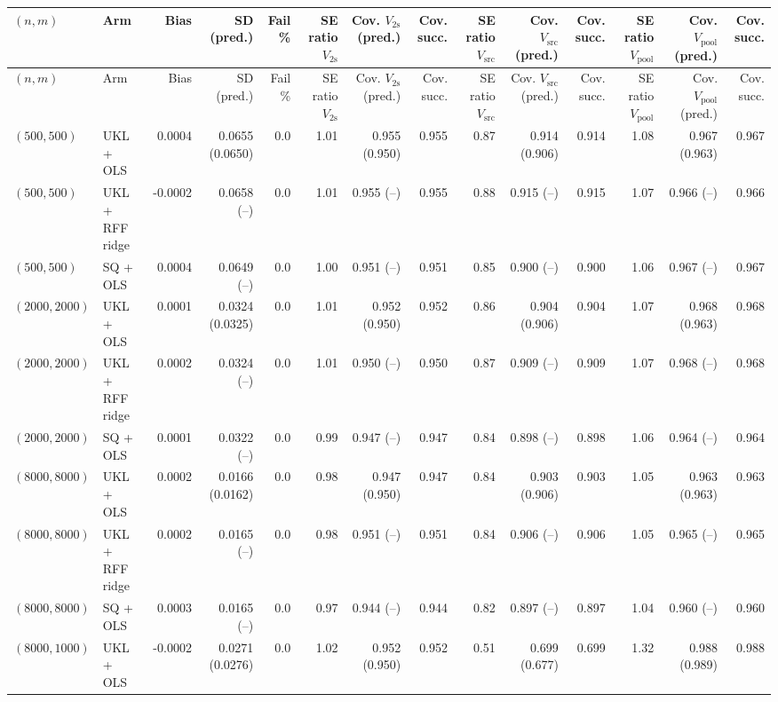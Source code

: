 \begin{tabular}{llrrrrrrrrrrrr}
\hline
$(n,m)$ & Arm & Bias & SD (pred.) & Fail \% & SE ratio $V_{\mathrm{2s}}$ & Cov. $V_{\mathrm{2s}}$ (pred.) & Cov. succ. & SE ratio $V_{\mathrm{src}}$ & Cov. $V_{\mathrm{src}}$ (pred.) & Cov. succ. & SE ratio $V_{\mathrm{pool}}$ & Cov. $V_{\mathrm{pool}}$ (pred.) & Cov. succ. \\
\hline
\endfirsthead
\hline
$(n,m)$ & Arm & Bias & SD (pred.) & Fail \% & SE ratio $V_{\mathrm{2s}}$ & Cov. $V_{\mathrm{2s}}$ (pred.) & Cov. succ. & SE ratio $V_{\mathrm{src}}$ & Cov. $V_{\mathrm{src}}$ (pred.) & Cov. succ. & SE ratio $V_{\mathrm{pool}}$ & Cov. $V_{\mathrm{pool}}$ (pred.) & Cov. succ. \\
\hline
\endhead
$(500,500)$ & UKL + OLS & 0.0004 & 0.0655 (0.0650) & 0.0 & 1.01 & 0.955 (0.950) & 0.955 & 0.87 & 0.914 (0.906) & 0.914 & 1.08 & 0.967 (0.963) & 0.967 \\
$(500,500)$ & UKL + RFF ridge & -0.0002 & 0.0658 (--) & 0.0 & 1.01 & 0.955 (--) & 0.955 & 0.88 & 0.915 (--) & 0.915 & 1.07 & 0.966 (--) & 0.966 \\
$(500,500)$ & SQ + OLS & 0.0004 & 0.0649 (--) & 0.0 & 1.00 & 0.951 (--) & 0.951 & 0.85 & 0.900 (--) & 0.900 & 1.06 & 0.967 (--) & 0.967 \\
$(2000,2000)$ & UKL + OLS & 0.0001 & 0.0324 (0.0325) & 0.0 & 1.01 & 0.952 (0.950) & 0.952 & 0.86 & 0.904 (0.906) & 0.904 & 1.07 & 0.968 (0.963) & 0.968 \\
$(2000,2000)$ & UKL + RFF ridge & 0.0002 & 0.0324 (--) & 0.0 & 1.01 & 0.950 (--) & 0.950 & 0.87 & 0.909 (--) & 0.909 & 1.07 & 0.968 (--) & 0.968 \\
$(2000,2000)$ & SQ + OLS & 0.0001 & 0.0322 (--) & 0.0 & 0.99 & 0.947 (--) & 0.947 & 0.84 & 0.898 (--) & 0.898 & 1.06 & 0.964 (--) & 0.964 \\
$(8000,8000)$ & UKL + OLS & 0.0002 & 0.0166 (0.0162) & 0.0 & 0.98 & 0.947 (0.950) & 0.947 & 0.84 & 0.903 (0.906) & 0.903 & 1.05 & 0.963 (0.963) & 0.963 \\
$(8000,8000)$ & UKL + RFF ridge & 0.0002 & 0.0165 (--) & 0.0 & 0.98 & 0.951 (--) & 0.951 & 0.84 & 0.906 (--) & 0.906 & 1.05 & 0.965 (--) & 0.965 \\
$(8000,8000)$ & SQ + OLS & 0.0003 & 0.0165 (--) & 0.0 & 0.97 & 0.944 (--) & 0.944 & 0.82 & 0.897 (--) & 0.897 & 1.04 & 0.960 (--) & 0.960 \\
$(8000,1000)$ & UKL + OLS & -0.0002 & 0.0271 (0.0276) & 0.0 & 1.02 & 0.952 (0.950) & 0.952 & 0.51 & 0.699 (0.677) & 0.699 & 1.32 & 0.988 (0.989) & 0.988 \\

\end{tabular}
